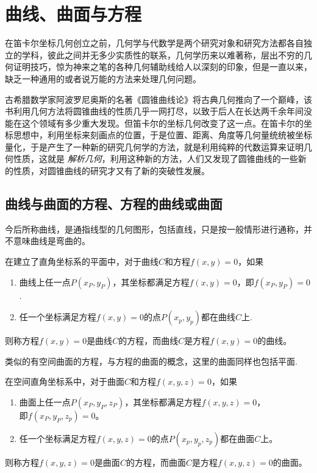 
\section{曲线、曲面与方程}
\label{sec:curve-and-equation}

在笛卡尔坐标几何创立之前，几何学与代数学是两个研究对象和研究方法都各自独立的学科，彼此之间并无多少实质性的联系，几何学历来以难著称，层出不穷的几何证明技巧，惊为神来之笔的各种几何辅助线给人以深刻的印象，但是一直以来，缺乏一种通用的或者说万能的方法来处理几何问题。

古希腊数学家阿波罗尼奥斯的名著《圆锥曲线论》将古典几何推向了一个巅峰，该书利用几何方法将圆锥曲线的性质几乎一网打尽，以致于后人在长达两千余年间没能在这个领域有多少重大发现。但笛卡尔的坐标几何改变了这一点。在笛卡尔的坐标思想中，利用坐标来刻画点的位置，于是位置、距离、角度等几何量统统被坐标量化，于是产生了一种新的研究几何学的方法，就是利用纯粹的代数运算来证明几何性质，这就是 \emph{解析几何}，利用这种新的方法，人们又发现了圆锥曲线的一些新的性质，对圆锥曲线的研究才又有了新的突破性发展。

\subsection{曲线与曲面的方程、方程的曲线或曲面}
\label{sec:equation-of-curve-and-curve-of-equation}

今后所称曲线，是通指线型的几何图形，包括直线，只是按一般情形进行通称，并不意味曲线是弯曲的。

\begin{definition}
  在建立了直角坐标系的平面中，对于曲线$C$和方程$f(x,y)=0$，如果
  \begin{enumerate}
  \item 曲线上任一点$P(x_P,y_P)$，其坐标都满足方程$f(x,y)=0$，即$f(x_P,y_P)=0$.
  \item 任一个坐标满足方程$f(x,y)=0$的点$P(x_p,y_p)$都在曲线$C$上.
  \end{enumerate}
  则称方程$f(x,y)=0$是曲线$C$的方程，而曲线$C$是方程$f(x,y)=0$的曲线。
\end{definition}

类似的有空间曲面的方程，与方程的曲面的概念，这里的曲面同样也包括平面.

\begin{definition}
  在空间直角坐标系中，对于曲面$C$和方程$f(x,y,z)=0$，如果
  \begin{enumerate}
  \item 曲面上任一点$P(x_P,y_P,z_P)$，其坐标都满足方程$f(x,y,z)=0$，\\即$f(x_P,y_P,z_p)=0$。
  \item 任一个坐标满足方程$f(x,y,z)=0$的点$P(x_p,y_p,z_p)$都在曲面$C$上。
  \end{enumerate}
  则称方程$f(x,y,z)=0$是曲面$C$的方程，而曲面$C$是方程$f(x,y,z)=0$的曲面。
\end{definition}

